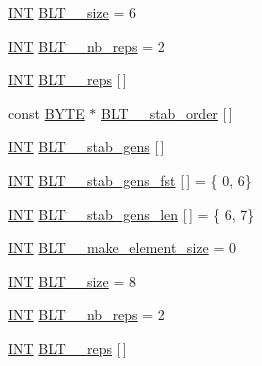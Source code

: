 \begin{DoxyCompactItemize}
\item 
\mbox{\hyperlink{galois_8h_a09fddde158a3a20bd2dcadb609de11dc}{I\+NT}} \mbox{\hyperlink{data___b_l_t_8_c_abdfbe46dad9ef70b4174d5f9ec1e9658}{B\+L\+T\+\_\+\_\+size}} = 6
\item 
\mbox{\hyperlink{galois_8h_a09fddde158a3a20bd2dcadb609de11dc}{I\+NT}} \mbox{\hyperlink{data___b_l_t_8_c_a92b627c49f983d8fb6dcaad42fb22f4e}{B\+L\+T\+\_\+\_\+nb\+\_\+reps}} = 2
\item 
\mbox{\hyperlink{galois_8h_a09fddde158a3a20bd2dcadb609de11dc}{I\+NT}} \mbox{\hyperlink{data___b_l_t_8_c_af690fa91eee5ef46d79bf90b9fa8d1d9}{B\+L\+T\+\_\+\_\+reps}} \mbox{[}$\,$\mbox{]}
\item 
const \mbox{\hyperlink{galois_8h_ab6cc7b4aeb6ea31aba2b3fbfc83ff5e6}{B\+Y\+TE}} $\ast$ \mbox{\hyperlink{data___b_l_t_8_c_a9e3c8c17ab2adb4fe077457fe67c57a5}{B\+L\+T\+\_\+\_\+stab\+\_\+order}} \mbox{[}$\,$\mbox{]}
\item 
\mbox{\hyperlink{galois_8h_a09fddde158a3a20bd2dcadb609de11dc}{I\+NT}} \mbox{\hyperlink{data___b_l_t_8_c_ab71ea08b50c737e47c2ddd06dfdad09f}{B\+L\+T\+\_\+\_\+stab\+\_\+gens}} \mbox{[}$\,$\mbox{]}
\item 
\mbox{\hyperlink{galois_8h_a09fddde158a3a20bd2dcadb609de11dc}{I\+NT}} \mbox{\hyperlink{data___b_l_t_8_c_a20467c77a6d935dc4e58b161b1d3f64e}{B\+L\+T\+\_\+\_\+stab\+\_\+gens\+\_\+fst}} \mbox{[}$\,$\mbox{]} = \{ 0, 6\}
\item 
\mbox{\hyperlink{galois_8h_a09fddde158a3a20bd2dcadb609de11dc}{I\+NT}} \mbox{\hyperlink{data___b_l_t_8_c_a4238c7b3917193b66afa4a16489e3395}{B\+L\+T\+\_\+\_\+stab\+\_\+gens\+\_\+len}} \mbox{[}$\,$\mbox{]} = \{ 6, 7\}
\item 
\mbox{\hyperlink{galois_8h_a09fddde158a3a20bd2dcadb609de11dc}{I\+NT}} \mbox{\hyperlink{data___b_l_t_8_c_ac82e99c7157172759b2dd112c6e5def6}{B\+L\+T\+\_\+\_\+make\+\_\+element\+\_\+size}} = 0
\item 
\mbox{\hyperlink{galois_8h_a09fddde158a3a20bd2dcadb609de11dc}{I\+NT}} \mbox{\hyperlink{data___b_l_t_8_c_ac1e52c37909228e83c81e3203d037570}{B\+L\+T\+\_\+\_\+size}} = 8
\item 
\mbox{\hyperlink{galois_8h_a09fddde158a3a20bd2dcadb609de11dc}{I\+NT}} \mbox{\hyperlink{data___b_l_t_8_c_a9b37b949226ab6a013a9666c28ba60ff}{B\+L\+T\+\_\+\_\+nb\+\_\+reps}} = 2
\item 
\mbox{\hyperlink{galois_8h_a09fddde158a3a20bd2dcadb609de11dc}{I\+NT}} \mbox{\hyperlink{data___b_l_t_8_c_a99877347abb57203f65f57a7c05b3336}{B\+L\+T\+\_\+\_\+reps}} \mbox{[}$\,$\mbox{]}

\end{DoxyCompactItemize}
